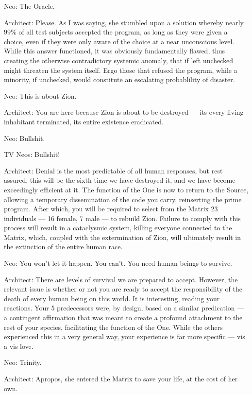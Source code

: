\documentclass[UTF8]{ctexart}
\newenvironment{myquote}{\color{green} \setlength{\leftskip}{6em} \setlength{\rightskip}{4em} \setlength{\parindent}{-2em}}{\par}
\begin{document}
\begin{myquote}
Neo: The Oracle.

Architect: Please. As I was saying, she stumbled upon a solution whereby nearly 99\% of all test subjects accepted the program, as long as they were given a choice, even if they were only aware of the choice at a near unconscious level. While this answer functioned, it was obviously fundamentally flawed, thus creating the otherwise contradictory systemic anomaly, that if left unchecked might threaten the system itself. Ergo those that refused the program, while a minority, if unchecked, would constitute an escalating probablility of disaster.

Neo: This is about Zion.

Architect: You are here because Zion is about to be destroyed --- its every living inhabitant terminated, its entire existence eradicated.

Neo: Bullshit.

TV Neos: Bullshit!

Architect: Denial is the most predictable of all human responses, but rest assured, this will be the sixth time we have destroyed it, and we have become exceedingly efficient at it. The function of the One is now to return to the Source, allowing a temporary dissemination of the code you carry, reinserting the prime program. After which, you will be required to select from the Matrix 23 individuals --- 16 female, 7 male --- to rebuild Zion. Failure to comply with this process will result in a cataclysmic system, killing everyone connected to the Matrix, which, coupled with the extermination of Zion, will ultimately result in the extinction of the entire human race.

Neo: You won't let it happen. You can't. You need human beings to survive.

Architect: There are levels of survival we are prepared to accept. However, the relevant issue is whether or not you are ready to accept the responsibility of the death of every human being on this world. It is interesting, reading your reactions. Your 5 predecessors were, by design, based on a similar predication --- a contingent affirmation that was meant to create a profound attachment to the rest of your species, facilitating the function of the One. While the others experienced this in a very general way, your experience is far more specific --- vis a vis love.

Neo: Trinity.

Architect: Apropos, she entered the Matrix to save your life, at the cost of her own.


\end{myquote}
\end{document}
